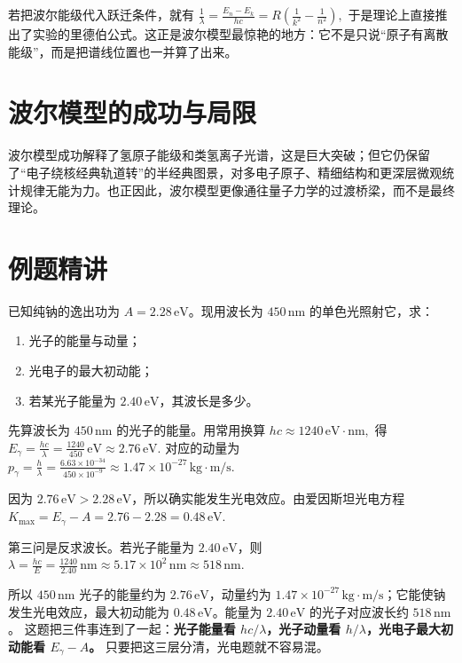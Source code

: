 \documentclass[lang=cn,11pt]{elegantbook}
\begin{document}
\begin{remark}
若把波尔能级代入跃迁条件，就有
 \(\frac{1}{\lambda}=\frac{E_n-E_k}{hc} =R\left(\frac{1}{k^2}-\frac{1}{n^2}\right),\) 
于是理论上直接推出了实验的里德伯公式。这正是波尔模型最惊艳的地方：它不是只说“原子有离散能级”，而是把谱线位置也一并算了出来。
\end{remark}

\section{波尔模型的成功与局限}

波尔模型成功解释了氢原子能级和类氢离子光谱，这是巨大突破；但它仍保留了“电子绕核经典轨道转”的半经典图景，对多电子原子、精细结构和更深层微观统计规律无能为力。也正因此，波尔模型更像通往量子力学的过渡桥梁，而不是最终理论。

\section{例题精讲}

\begin{exercise}[450\,nm 单色光照射纯钠时会发生什么]
已知纯钠的逸出功为 \(A=2.28\,\mathrm{eV}\)。现用波长为 \(450\,\mathrm{nm}\) 的单色光照射它，求：
\begin{enumerate}
 \item 光子的能量与动量；
 \item 光电子的最大初动能；
 \item 若某光子能量为 \(2.40\,\mathrm{eV}\)，其波长是多少。
\end{enumerate}
\end{exercise}

\begin{solution}
先算波长为 \(450\,\mathrm{nm}\) 的光子的能量。用常用换算
 \(hc\approx 1240\,\mathrm{eV\cdot nm},\) 
得
 \(E_\gamma=\frac{hc}{\lambda} =\frac{1240}{450}\,\mathrm{eV} \approx 2.76\,\mathrm{eV}.\) 
对应的动量为
 \(p_\gamma=\frac{h}{\lambda} =\frac{6.63\times 10^{-34}}{450\times 10^{-9}} \approx 1.47\times 10^{-27}\,\mathrm{kg\cdot m/s}.\) 

因为 \(2.76\,\mathrm{eV}>2.28\,\mathrm{eV}\)，所以确实能发生光电效应。由爱因斯坦光电方程
 \(K_{\max}=E_\gamma-A=2.76-2.28=0.48\,\mathrm{eV}.\) 

第三问是反求波长。若光子能量为 \(2.40\,\mathrm{eV}\)，则
 \(\lambda=\frac{hc}{E} =\frac{1240}{2.40}\,\mathrm{nm} \approx 5.17\times 10^2\,\mathrm{nm} \approx 518\,\mathrm{nm}.\) 

所以 \(450\,\mathrm{nm}\) 光子的能量约为 \(2.76\,\mathrm{eV}\)，动量约为 \(1.47\times10^{-27}\,\mathrm{kg\cdot m/s}\)；它能使钠发生光电效应，最大初动能为 \(0.48\,\mathrm{eV}\)。能量为 \(2.40\,\mathrm{eV}\) 的光子对应波长约 \(518\,\mathrm{nm}\)。
这题把三件事连到了一起：\textbf{光子能量看 \(hc/\lambda\)，光子动量看 \(h/\lambda\)，光电子最大初动能看 \(E_\gamma-A\)。} 只要把这三层分清，光电题就不容易混。
\end{solution}
\end{document}
